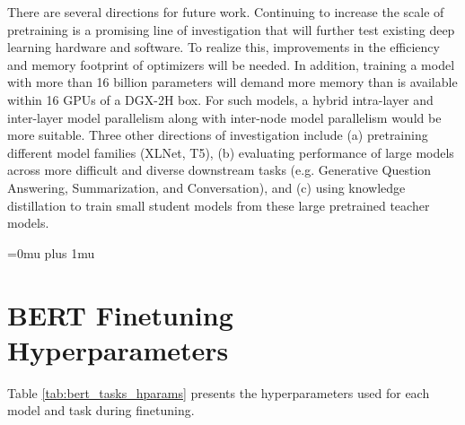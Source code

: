 \documentclass{article}
\begin{document}
There are several directions for future work. Continuing to increase the scale of pretraining is a promising line of investigation that will further test existing deep learning hardware and software. To realize this, improvements in the efficiency and memory footprint of optimizers will be needed. In addition, training a model with more than 16 billion parameters will demand more memory than is available within 16 GPUs of a DGX-2H box. For such models, a hybrid intra-layer and inter-layer model parallelism along with inter-node model parallelism would be more suitable.
Three other directions of investigation include (a) pretraining different model families (XLNet, T5), (b) evaluating performance of large models across more difficult and diverse downstream tasks (e.g. Generative Question Answering, Summarization, and Conversation), and (c) using knowledge distillation to train small student models from these large pretrained teacher models.

\Urlmuskip=0mu plus 1mu\relax



\appendix

\section{BERT Finetuning Hyperparameters}
\label{app:berthparams}

Table \ref{tab:bert_tasks_hparams} presents the hyperparameters used for each model and task during finetuning.
\end{document}

